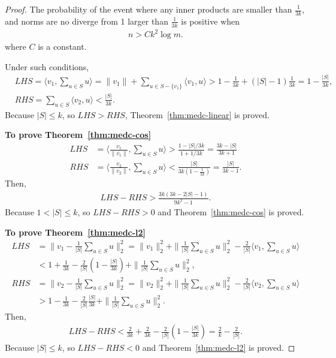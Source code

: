 \begin{proof}
The probability of the event where any inner products are smaller than $\frac{1}{3k}$, and norms are no diverge from 1 larger than $\frac{1}{3k}$ is positive when
\begin{align}
	n > C k^2 \log m.
\end{align}
where $C$ is a constant.

Under such conditions,
\begin{align}
    &LHS = \langle v_1, \sum_{u\in S} u \rangle = \|v_1\| + \sum_{u\in S-\{v_1\}} \langle v_1, u\rangle > 1 - \frac{1}{3k} + (|S|-1) \frac{1}{3k} = 1 - \frac{|S|}{3k}, \\
    &RHS = \sum_{u\in S} \langle v_2, u\rangle < \frac{|S|}{3k}.
\end{align}
Because $|S| \leq k$, so $LHS > RHS$, Theorem~\ref{thm:medc-linear} is proved.

\textbf{To prove Theorem~\ref{thm:medc-cos}}
\begin{align}
    LHS &= \langle \frac{v_1}{\|v_1\|}, \sum_{u\in S} u \rangle > \frac{1 - |S| / 3k}{1 + 1/3k} = \frac{3k-|S|}{3k + 1} \\
    RHS &= \langle \frac{v_2}{\|v_2\|}, \sum_{u\in S} u \rangle < \frac{|S|}{3k(1-\frac{1}{3k})} = \frac{|S|}{3k-1}.
\end{align}
Then,
\begin{align}
    LHS - RHS  > \frac{3k(3k - 2|S| -1)}{9k^2-1}.
\end{align}
Because $1 < |S| \leq k$, so $LHS - RHS > 0$ and Theorem~\ref{thm:medc-cos} is proved.

\textbf{To prove Theorem~\ref{thm:medc-l2}}
\begin{align}
    LHS & = \|v_1 - \frac{1}{|S|} \sum_{u\in S} u \|_2^2 = \|v_1\|_2^2 + \|\frac{1}{|S|} \sum_{u\in S} u \|_2^2 - \frac{2}{|S|}\langle v_1, \sum_{u\in S} u \rangle\\
    & < 1+\frac{1}{3k} - \frac{2}{|S|}(1-\frac{|S|}{3k})  + \|\frac{1}{|S|} \sum_{u\in S} u \|_2^2, \\
    RHS & = \|v_2 - \frac{1}{|S|} \sum_{u\in S} u \|_2^2 = \|v_2\|_2^2 + \|\frac{1}{|S|} \sum_{u\in S} u \|_2^2 - \frac{2}{|S|}\langle v_2, \sum_{u\in S} u \rangle \\
    & >  1-\frac{1}{3k} - \frac{2}{|S|}\frac{|S|}{3k} + \|\frac{1}{|S|} \sum_{u\in S} u \|_2^2.
\end{align}
Then,
\begin{align}
    LHS - RHS < \frac{2}{3k} + \frac{2}{3k} - \frac{2}{|S|}(1-\frac{|S|}{3k}) = \frac{2}{k} - \frac{2}{|S|}.
\end{align}
Because $|S| \leq k$, so $LHS - RHS < 0$ and Theorem~\ref{thm:medc-l2} is proved.
\end{proof}

